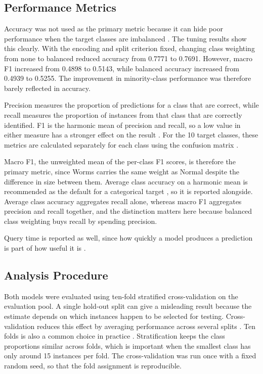 \documentclass[conference]{IEEEtran}
\begin{document}
\subsection{Performance Metrics}
\label{sec:metrics}

Accuracy was not used as the primary metric because it can hide poor 
performance when the target classes are imbalanced \cite{kelleher2015}. The 
tuning results show this clearly. With the encoding and split criterion fixed, 
changing class weighting from none to balanced reduced accuracy from 0.7771 to 
0.7691. However, macro F1 increased from 0.4898 to 0.5143, while balanced 
accuracy increased from 0.4939 to 0.5255. The improvement in minority-class 
performance was therefore barely reflected in accuracy.

Precision measures the proportion of predictions for a class that are correct, 
while recall measures the proportion of instances from that class that are 
correctly identified. F1 is the harmonic mean of precision and recall, so a low 
value in either measure has a stronger effect on the result \cite{kelleher2015}. 
For the 10 target classes, these metrics are calculated separately for each 
class using the confusion matrix \cite{kelleher2015}.

Macro F1, the unweighted mean of the per-class F1 scores, is therefore the
primary metric, since Worms carries the same weight as Normal despite the
difference in size between them. Average class accuracy on a harmonic mean is
recommended as the default for a categorical target \cite{kelleher2015}, so it
is reported alongside. Average class accuracy aggregates recall alone, whereas
macro F1 aggregates precision and recall together, and the distinction matters
here because balanced class weighting buys recall by spending precision.

Query time is reported as well, since how quickly a model produces a prediction
is part of how useful it is \cite{kelleher2015}.

\subsection{Analysis Procedure}
\label{sec:analysis}
Both models were evaluated using ten-fold stratified cross-validation on the 
evaluation pool. A single hold-out split can give a misleading result because 
the estimate depends on which instances happen to be selected for testing. 
Cross-validation reduces this effect by averaging performance across several 
splits \cite{kelleher2015}. Ten folds is also a common choice in practice 
\cite{kelleher2015}. Stratification keeps the 
class proportions similar across folds, which is important when the smallest 
class has only around 15 instances per fold. The cross-validation was run once with a fixed random seed, so that the fold
assignment is reproducible.
\end{document}

